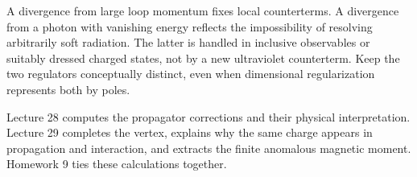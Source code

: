 \documentclass[11pt]{article}
\begin{document}
\begin{remarkbox}
A divergence from large loop momentum fixes local counterterms. A
divergence from a photon with vanishing energy reflects the impossibility
of resolving arbitrarily soft radiation. The latter is handled in
inclusive observables or suitably dressed charged states, not by a new
ultraviolet counterterm. Keep the two regulators conceptually distinct,
even when dimensional regularization represents both by poles.
\end{remarkbox}
Lecture 28 computes the propagator corrections and their physical
interpretation. Lecture 29 completes the vertex, explains why the same
charge appears in propagation and interaction, and extracts the finite
anomalous magnetic moment. Homework 9 ties these calculations together.
\end{document}
